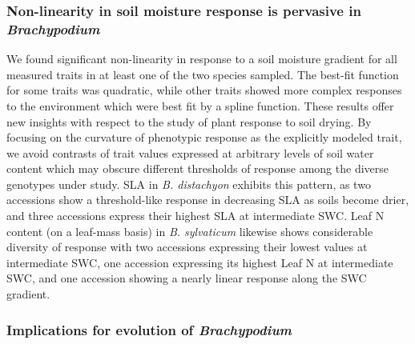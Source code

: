\documentclass[jou,floatsintext]{apa6}
\begin{document}
\hypertarget{non-linearity-in-soil-moisture-response-is-pervasive-in-brachypodium}{%
\subsubsection{\texorpdfstring{Non-linearity in soil moisture response is pervasive in \emph{Brachypodium}}{Non-linearity in soil moisture response is pervasive in Brachypodium}}\label{non-linearity-in-soil-moisture-response-is-pervasive-in-brachypodium}}

We found significant non-linearity in response to a soil moisture gradient for all measured traits in at least one of the two species sampled. The best-fit function for some traits was quadratic, while other traits showed more complex responses to the environment which were best fit by a spline function. These results offer new insights with respect to the study of plant response to soil drying. By focusing on the curvature of phenotypic response as the explicitly modeled trait, we avoid contrasts of trait values expressed at arbitrary levels of soil water content which may obscure different thresholds of response among the diverse genotypes under study. SLA in \emph{B. distachyon} exhibits this pattern, as two accessions show a threshold-like response in decreasing SLA as soils become drier, and three accessions express their highest SLA at intermediate SWC. Leaf N content (on a leaf-mass basis) in \emph{B. sylvaticum} likewise shows considerable diversity of response with two accessions expressing their lowest values at intermediate SWC, one accession expressing its highest Leaf N at intermediate SWC, and one accession showing a nearly linear response along the SWC gradient.

\hypertarget{implications-for-evolution-of-brachypodium}{%
\subsubsection{\texorpdfstring{Implications for evolution of \emph{Brachypodium}}{Implications for evolution of Brachypodium}}\label{implications-for-evolution-of-brachypodium}}
\end{document}
